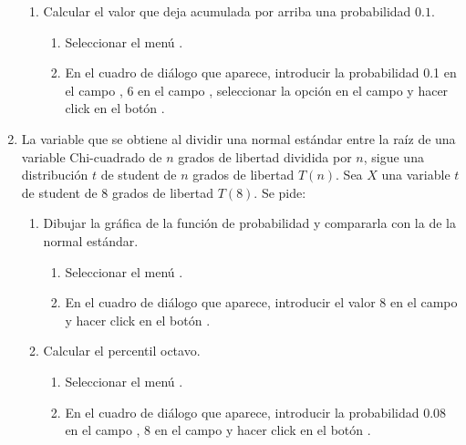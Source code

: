 \begin{enumerate}[leftmargin=*]
\begin{enumerate}
\item Calcular el valor que deja acumulada por arriba una probabilidad $0.1$.
\begin{indicacion}{
\begin{enumerate}
\item Seleccionar el menú .
\item En el cuadro de diálogo que aparece, introducir la probabilidad 0.1 en el campo , 6 en el
campo , seleccionar la opción  en el campo  y hacer
click en el botón .
\end{enumerate}}
\end{indicacion}
\end{enumerate}


\item La variable que se obtiene al dividir una normal estándar entre la raíz de una variable Chi-cuadrado de $n$ grados
de libertad dividida por $n$, sigue una distribución $t$ de student de $n$ grados de libertad $T(n)$. 
Sea $X$ una variable $t$ de student de 8 grados de libertad $T(8)$. Se pide:
\begin{enumerate}
\item Dibujar la gráfica de la función de probabilidad y compararla con la de la normal estándar.
\begin{indicacion}{
\begin{enumerate}
\item Seleccionar el menú .
\item En el cuadro de diálogo que aparece, introducir el valor 8 en el campo  y hacer click en
el botón .
\end{enumerate}}
\end{indicacion}

\item Calcular el percentil octavo. 
\begin{indicacion}{
\begin{enumerate}
\item Seleccionar el menú .
\item En el cuadro de diálogo que aparece, introducir la probabilidad 0.08 en el campo , 8 en el campo  y hacer click en el botón .
\end{enumerate}}
\end{indicacion}


\end{enumerate}
\end{enumerate}
